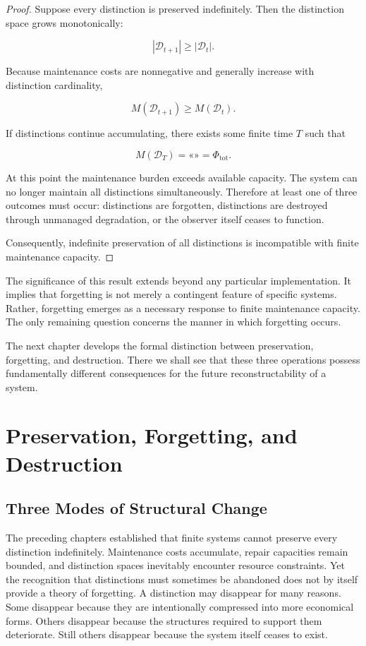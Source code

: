 \documentclass[12pt,oneside]{book}
\theoremstyle{plain} \newtheorem{theorem}{Theorem}[chapter] \newtheorem{lemma}[theorem]{Lemma} \newtheorem{proposition}[theorem]{Proposition} \newtheorem{corollary}[theorem]{Corollary}
\theoremstyle{definition} \newtheorem{definition}[theorem]{Definition} \newtheorem{axiom}[theorem]{Axiom} \newtheorem{construction}[theorem]{Construction}
\theoremstyle{remark} \newtheorem{remark}[theorem]{Remark} \newtheorem{example}[theorem]{Example}
\newcommand{\D}{\mathcal{D}} \newcommand{\R}{\mathcal{R}} \newcommand{\F}{\mathcal{F}} \newcommand{\U}{\mathcal{U}} \newcommand{\M}{\mathcal{M}} \newcommand{\G}{\Gamma}
\begin{document}
\begin{proof}

Suppose every distinction is preserved indefinitely. Then the distinction space grows monotonically:

\[
|\D_{t+1}|
\geq
|\D_t|.
\]

Because maintenance costs are nonnegative and generally increase with distinction cardinality,

\[
M(\D_{t+1})
\geq
M(\D_t).
\]

If distinctions continue accumulating, there exists some finite time $T$ such that

\[
M(\D_T)
=
«»
=
\Phi_{\mathrm{tot}}.
\]

At this point the maintenance burden exceeds available capacity. The system can no longer maintain all distinctions simultaneously. Therefore at least one of three outcomes must occur: distinctions are forgotten, distinctions are destroyed through unmanaged degradation, or the observer itself ceases to function.

Consequently, indefinite preservation of all distinctions is incompatible with finite maintenance capacity.

\end{proof}

The significance of this result extends beyond any particular implementation. It implies that forgetting is not merely a contingent feature of specific systems. Rather, forgetting emerges as a necessary response to finite maintenance capacity. The only remaining question concerns the manner in which forgetting occurs.

The next chapter develops the formal distinction between preservation, forgetting, and destruction. There we shall see that these three operations possess fundamentally different consequences for the future reconstructability of a system.

\chapter{Preservation, Forgetting, and Destruction}

\section{Three Modes of Structural Change}

The preceding chapters established that finite systems cannot preserve every distinction indefinitely. Maintenance costs accumulate, repair capacities remain bounded, and distinction spaces inevitably encounter resource constraints. Yet the recognition that distinctions must sometimes be abandoned does not by itself provide a theory of forgetting. A distinction may disappear for many reasons. Some disappear because they are intentionally compressed into more economical forms. Others disappear because the structures required to support them deteriorate. Still others disappear because the system itself ceases to exist.
\end{document}
